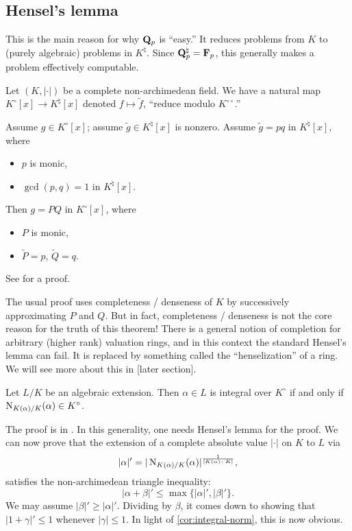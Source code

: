 \subsection{Hensel's lemma}

This is the main reason for why $\mathbf{Q}_p$ is ``easy.'' It reduces problems from 
$K$ to (purely algebraic) problems in $K^\natural$. Since 
$\mathbf{Q}_p^\natural=\mathbf{F}_p$, this generally makes a problem effectively computable. 

Let $(K,|\cdot|)$ be a complete non-archimedean field. We have a natural map 
$K^\circ[x]\to K^\natural[x]$ denoted $f\mapsto \tilde f$, ``reduce modulo 
$K^{\circ\circ}$.''

\begin{theorem}[Hensel]\label{thm:Hensel}
Assume $g\in K^\circ[x]$; assume $\tilde g\in K^\natural[x]$ is nonzero. 
Assume $\tilde g=p q$ in $K^\natural[x]$, where 
\begin{itemize}
\item
$p$ is monic, 

\item
$\gcd(p,q)=1$ in $K^\natural[x]$.
\end{itemize}
Then $g=P Q$ in $K^\circ[x]$, where 
\begin{itemize}
\item $P$ is monic, 
\item $\tilde P=p$, $\tilde Q=q$. 
\end{itemize}
\end{theorem}

See \cite{bosch-2014} for a proof. 

The usual proof uses completeness / denseness of $K$ by successively 
approximating $P$ and $Q$. But in fact, completeness / denseness is not the 
core reason for the truth of this theorem! There is a general notion of 
completion for arbitrary (higher rank) valuation rings, and in this context the 
standard Hensel's lemma can fail. It is replaced by something called the 
``henselization'' of a ring. We will see more about this in [later section]. 

\begin{corollary}\label{cor:integral-norm}
Let $L/K$ be an algebraic extension. Then $\alpha\in L$ is integral over 
$K^\circ$ if and only if $\operatorname{N}_{K(\alpha)/K}(\alpha)\in K^\circ$. 
\end{corollary}

The proof is in \cite{bosch-2014}. In this generality, one needs Hensel's lemma 
for the proof. We can now prove that the extension of a complete absolute 
value $|\cdot|$ on $K$ to $L$ via 
\[
  |\alpha|' = |\operatorname{N}_{K(\alpha)/K}(\alpha)|^{\frac{1}{[K(\alpha)\colon K]}} ,
\]
satisfies the non-archimedean triangle inequality: 
\[
  |\alpha+\beta|'\leqslant \max\{|\alpha|',|\beta|'\} .
\]
We may assume $|\beta|'\geqslant |\alpha|'$. Dividing by $\beta$, it comes 
down to showing that $|1+\gamma|'\leqslant 1$ whenever $|\gamma|\leqslant 1$. 
In light of \autoref{cor:integral-norm}, this is now obvious. 

